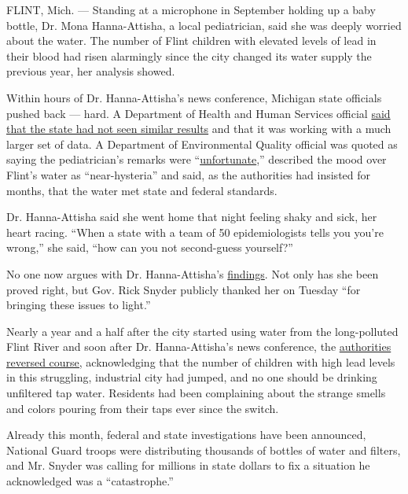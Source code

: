FLINT, Mich. --- Standing at a microphone in September holding up a baby
bottle, Dr. Mona Hanna-Attisha, a local pediatrician, said she was
deeply worried about the water. The number of Flint children with
elevated levels of lead in their blood had risen alarmingly since the
city changed its water supply the previous year, her analysis showed.

Within hours of Dr. Hanna-Attisha's news conference, Michigan state
officials pushed back --- hard. A Department of Health and Human
Services official
\href{http://www.mlive.com/news/flint/index.ssf/2015/09/state_says_its_data_shows_no_c.html}{said
that the state had not seen similar results} and that it was working
with a much larger set of data. A Department of Environmental Quality
official was quoted as saying the pediatrician's remarks were
``\href{http://www.crainsdetroit.com/article/20150928/NEWS01/150929872/doctors-urge-flint-to-stop-using-water-from-flint-river}{unfortunate},''
described the mood over Flint's water as ``near-hysteria'' and said, as
the authorities had insisted for months, that the water met state and
federal standards.

Dr. Hanna-Attisha said she went home that night feeling shaky and sick,
her heart racing. ``When a state with a team of 50 epidemiologists tells
you you're wrong,'' she said, ``how can you not second-guess yourself?''

No one now argues with Dr. Hanna-Attisha's
\href{http://ajph.aphapublications.org/doi/full/10.2105/AJPH.2015.303003}{findings}.
Not only has she been proved right, but Gov. Rick Snyder publicly
thanked her on Tuesday ``for bringing these issues to light.''

Nearly a year and a half after the city started using water from the
long-polluted Flint River and soon after Dr. Hanna-Attisha's news
conference, the
\href{http://www.nytimes.com/2015/10/08/us/reassurances-end-in-flint-after-months-of-concern.html?_r=0}{authorities
reversed course,} acknowledging that the number of children with high
lead levels in this struggling, industrial city had jumped, and no one
should be drinking unfiltered tap water. Residents had been complaining
about the strange smells and colors pouring from their taps ever since
the switch.

Already this month, federal and state investigations have been
announced, National Guard troops were distributing thousands of bottles
of water and filters, and Mr. Snyder was calling for millions in state
dollars to fix a situation he acknowledged was a ``catastrophe.''

